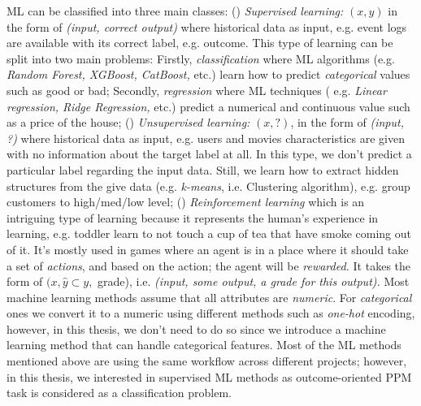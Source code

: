 ML can be classified into three main classes: () \textit{Supervised learning:} $(x,y)$ in the form of \textit{(input, correct output)} where historical data as input, e.g. event logs are available with its correct label, e.g. outcome. This type of learning can be split into two main problems: Firstly, \textit{classification} where ML algorithms (e.g. \textit{Random Forest, XGBoost, CatBoost,} etc.) learn how to predict \textit{categorical} values such as good or bad; Secondly, \textit{regression} where ML techniques ( e.g. \textit{Linear regression, Ridge Regression,} etc.) predict a numerical and continuous value such as a price of the house; () \textit{Unsupervised learning:} $(x, ?)$, in the form of \textit{(input, ?)} where historical data as input, e.g. users and movies characteristics are given with no information about the target label at all. In this type, we don’t predict a particular label regarding the input data. Still, we learn how to extract hidden structures from the give data (e.g. \textit{k-means}, i.e. Clustering algorithm), e.g. group customers to high/med/low level; () \textit{Reinforcement learning} which is an intriguing type of learning because  it represents the human's  experience in learning, e.g. toddler learn to not touch a cup of tea that have smoke coming out of it. It's mostly used in games where an agent is in a place where it should take a set of \textit{actions}, and based on the action; the agent will be \textit{rewarded.} It takes the form of $(x, \hat{y} \subset  y,$ grade), i.e. \textit{(input, some output, a grade for this output).} Most machine learning methods assume that all attributes are \textit{numeric}. For \textit{categorical} ones we convert it to a numeric using different methods such as \textit{one-hot} encoding, however, in this thesis, we don’t need to do so since we introduce a machine learning method that can handle categorical features. Most of the ML methods mentioned above are using the same workflow across different projects; however, in this thesis, we interested in supervised ML methods as outcome-oriented PPM task is considered as a classification problem. 


